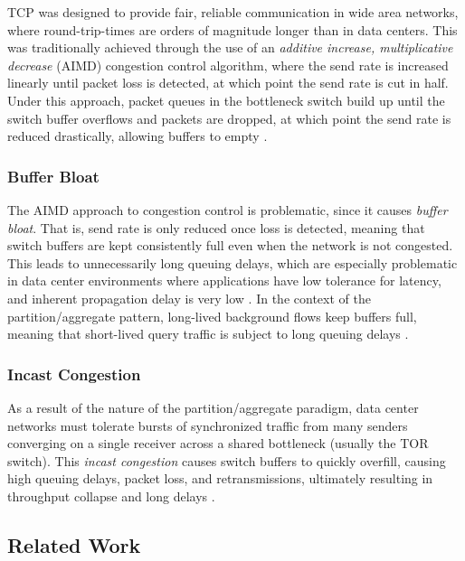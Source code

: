 \documentclass[letterpaper,twocolumn,10pt]{article}
\begin{document}
TCP was designed to provide fair, reliable communication in wide area networks, where round-trip-times are orders of magnitude longer than in data centers. This was traditionally achieved through the use of an \emph{additive increase, multiplicative decrease} (AIMD) congestion control algorithm, where the send rate is increased linearly until packet loss is detected, at which point the send rate is cut in half. Under this approach, packet queues in the bottleneck switch build up until the switch buffer overflows and packets are dropped, at which point the send rate is reduced drastically, allowing buffers to empty \cite{chiu1989analysis}.

\subsubsection{Buffer Bloat}

The AIMD approach to congestion control is problematic, since it causes \emph{buffer bloat}. That is, send rate is only reduced once loss is detected, meaning that switch buffers are kept consistently full even when the network is not congested. This leads to unnecessarily long queuing delays, which are especially problematic in data center environments where applications have low tolerance for latency, and inherent propagation delay is very low \cite{alizadeh_data_2010, cardwell_bbr:_2016, chen_understanding_2009, wu_ictcp:_2013}. In the context of the partition/aggregate pattern, long-lived background flows keep buffers full, meaning that short-lived query traffic is subject to long queuing delays \cite{alizadeh_data_2010}.

\subsubsection{Incast Congestion}

As a result of the nature of the partition/aggregate paradigm, data center networks must tolerate bursts of synchronized traffic from many senders converging on a single receiver across a shared bottleneck (usually the TOR switch). This \emph{incast congestion} causes switch buffers to quickly overfill, causing high queuing delays, packet loss, and retransmissions, ultimately resulting in throughput collapse and long delays \cite{alizadeh_data_2010, chen_understanding_2009, wu_ictcp:_2013}.

\subsection{Related Work}
\end{document}
